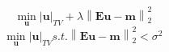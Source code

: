 \documentclass[leqno]{article}
\begin{document}
\[
\min_{\mathbf{u}} \left| \mathbf{u} \right|_{TV} + \lambda \left\| \mathbf{E}\mathbf{u}-\mathbf{m} \right\|_2^2
\]
\[
\min_{\mathbf{u}} \left| \mathbf{u} \right|_{TV} s.t. \left\| \mathbf{E}\mathbf{u}-\mathbf{m} \right\|_2^2<\sigma^2
\]
\end{document}
